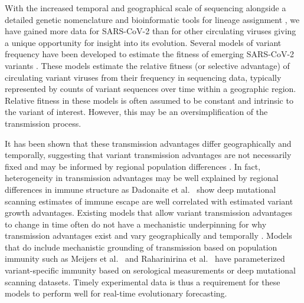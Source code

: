 \documentclass[11pt,oneside,letterpaper]{article}
\begin{document}

With the increased temporal and geographical scale of sequencing alongside a detailed genetic nomenclature \cite{rambaut2020dynamic} and bioinformatic tools for lineage assignment \cite{turakhia2021ultrafast, aksamentov2021nextclade}, we have gained more data for SARS-CoV-2 than for other circulating viruses giving a unique opportunity for insight into its evolution.
Several models of variant frequency have been developed to estimate the fitness of emerging SARS-CoV-2 variants \cite{Annavajhala2021, Piantham2022, figgins2022sars, susswein2023leveraging, Lefrancq2023, abousamra2024fitness}.
These models estimate the relative fitness (or selective advantage) of circulating variant viruses from their frequency in sequencing data, typically represented by counts of variant sequences over time within a geographic region.
Relative fitness in these models is often assumed to be constant and intrinsic to the variant of interest.
However, this may be an oversimplification of the transmission process.

It has been shown that these transmission advantages differ geographically and temporally, suggesting that variant transmission advantages are not necessarily fixed and may be informed by regional population differences \cite{figgins2022sars, vanDorp2022}.
In fact, heterogeneity in transmission advantages may be well explained by regional differences in immune structure as Dadonaite et al.\ \cite{Dadonaite2023} show deep mutational scanning estimates of immune escape are well correlated with estimated variant growth advantages.
Existing models that allow variant transmission advantages to change in time often do not have a mechanistic underpinning for why transmission advantages exist and vary geographically and temporally \cite{figgins2022sars, susswein2023leveraging}.
Models that do include mechanistic grounding of transmission based on population immunity such as Meijers et al.\ \cite{Meijers2023} and Raharinirina et al.\ \cite{Raharinirina2025} have parameterized variant-specific immunity based on serological measurements or deep mutational scanning datasets.
Timely experimental data is thus a requirement for these models to perform well for real-time evolutionary forecasting.
\end{document}
